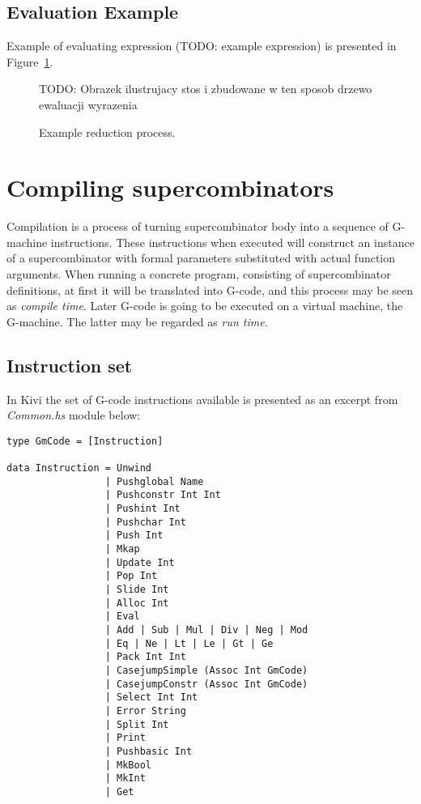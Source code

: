 \documentclass[12pt,a4paper]{report}
\begin{document}
\subsection{Evaluation Example}
Example of evaluating expression (TODO: example expression) is presented
in Figure~\ref{fig:example_reduction}.

\begin{figure}[h!]
  \centering

  TODO: Obrazek ilustrujacy stos i zbudowane w ten sposob drzewo ewaluacji
  wyrazenia

  \caption{Example reduction process.}
  \label{fig:example_reduction}
\end{figure}

\section{Compiling supercombinators}
Compilation is a process of turning supercombinator body into a sequence of
G-machine instructions. These instructions when executed will construct an
instance of a supercombinator with formal parameters substituted with actual
function arguments. When running a concrete program, consisting of
supercombinator definitions, at first it will be translated into G-code, and this
process may be seen as \textit{compile time}. Later G-code is going to be
executed on a virtual machine, the G-machine. The latter may be regarded as
\textit{run time}.


\subsection{Instruction set}
In Kivi the set of G-code instructions available is presented as an excerpt
from \textit{Common.hs} module below:

\hspace*{-1.5in}
\begin{lstlisting}[style=haskell]
type GmCode = [Instruction]

data Instruction = Unwind
                 | Pushglobal Name
                 | Pushconstr Int Int
                 | Pushint Int
                 | Pushchar Int
                 | Push Int
                 | Mkap
                 | Update Int
                 | Pop Int
                 | Slide Int
                 | Alloc Int
                 | Eval
                 | Add | Sub | Mul | Div | Neg | Mod
                 | Eq | Ne | Lt | Le | Gt | Ge
                 | Pack Int Int
                 | CasejumpSimple (Assoc Int GmCode)
                 | CasejumpConstr (Assoc Int GmCode)
                 | Select Int Int
                 | Error String
                 | Split Int
                 | Print
                 | Pushbasic Int
                 | MkBool
                 | MkInt
                 | Get
\end{lstlisting}
\end{document}
